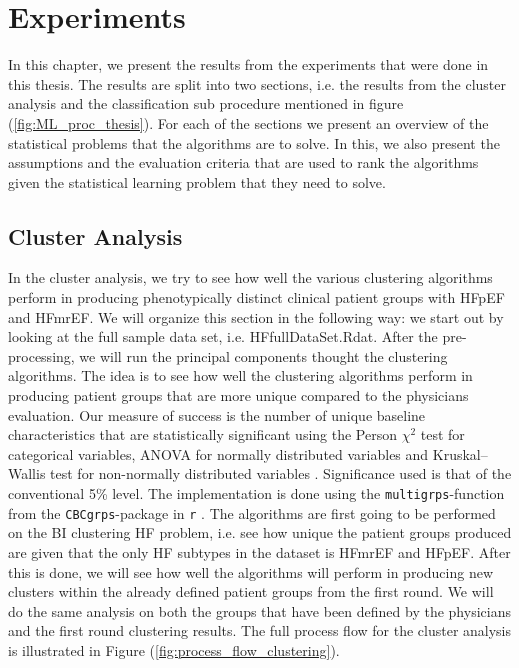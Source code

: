 \documentclass[../thesis.tex]{subfiles}
\begin{document}
\chapter{Experiments}
\label{chap:exp}

\noindent In this chapter, we present the results from the experiments that were done in this thesis. The results are split into two sections, i.e. the results from the cluster analysis and the classification sub procedure mentioned in figure (\ref{fig:ML_proc_thesis}). For each of the sections we present an overview of the statistical problems that the algorithms are to solve. In this, we also present the assumptions and the evaluation criteria that are used to rank the algorithms given the statistical learning problem that they need to solve. 

\section{Cluster Analysis}

\noindent In the cluster analysis, we try to see how well the various clustering algorithms perform in producing phenotypically distinct clinical patient groups with HFpEF and HFmrEF. We will organize this section in the following way: we start out by looking at the full sample data set, i.e. HFfullDataSet.Rdat. After the pre-processing, we will run the principal components thought the clustering algorithms. The idea is to see how well the clustering algorithms perform in producing patient groups that are more unique compared to the physicians evaluation. Our measure of success is the number of unique baseline characteristics that are statistically significant using the Person $\chi^2$ test for categorical variables, ANOVA for normally distributed variables and Kruskal–Wallis test for non-normally distributed variables \citep{kruskal1952use}. Significance used is that of the conventional 5\% level. The implementation is done using the \texttt{multigrps}-function from the \texttt{CBCgrps}-package in \texttt{r} \citep{CBCgrps}. The algorithms are first going to be performed on the BI clustering HF problem, i.e. see how unique the patient groups produced are given that the only HF subtypes in the dataset is HFmrEF and HFpEF. After this is done, we will see how well the algorithms will perform in producing new clusters within the already defined patient groups from the first round. We will do the same analysis on both the groups that have been defined by the physicians and the first round clustering results. The full process flow for the cluster analysis is illustrated in Figure (\ref{fig:process_flow_clustering}).
\end{document}

